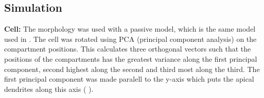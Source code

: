 \documentclass[altfont, fleqn]{uiophd}
\renewcommand{\cref}[1]{{\color{viridis_03}\mycref{#1}} }
\begin{document}
\subsection{Simulation}
\textbf{Cell:}
The \textcite{mainen_influence_1996} morphology was used with a passive model, which is 
the same model used in \textcite{pettersen_amplitude_2008}. 
The cell was rotated using PCA (principal component analysis) on the compartment
positions.
This calculates three orthogonal vectors such that 
the positions of the compartments 
has the greatest variance along the first principal component, 
second highest along the second and third most along the third.
The first principal component was made paralell to the y-axis which
puts the apical dendrites along this axis
(\cref{fig:4_1_morph}).
\\
\end{document}
